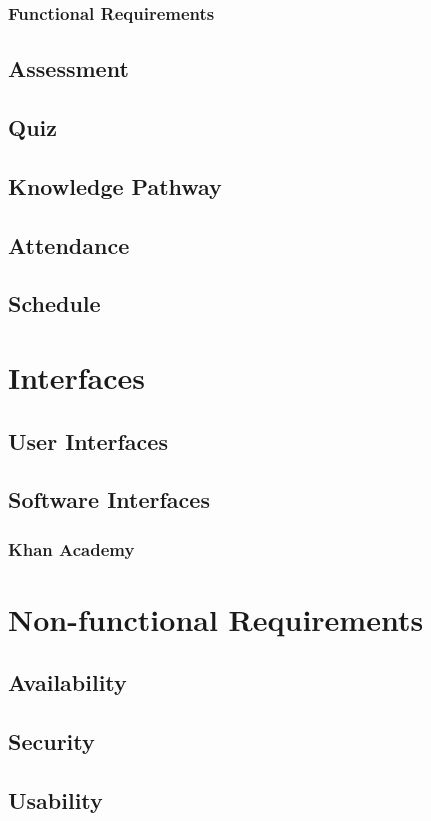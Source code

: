 \subsubsection{Functional Requirements}

\subsection{Assessment}

\subsection{Quiz}

\subsection{Knowledge Pathway}

\subsection{Attendance}

\subsection{Schedule}

\section{Interfaces}

\subsection{User Interfaces}

\subsection{Software Interfaces}

\subsubsection{Khan Academy}

\section{Non-functional Requirements}

\subsection{Availability}

\subsection{Security}

\subsection{Usability}
